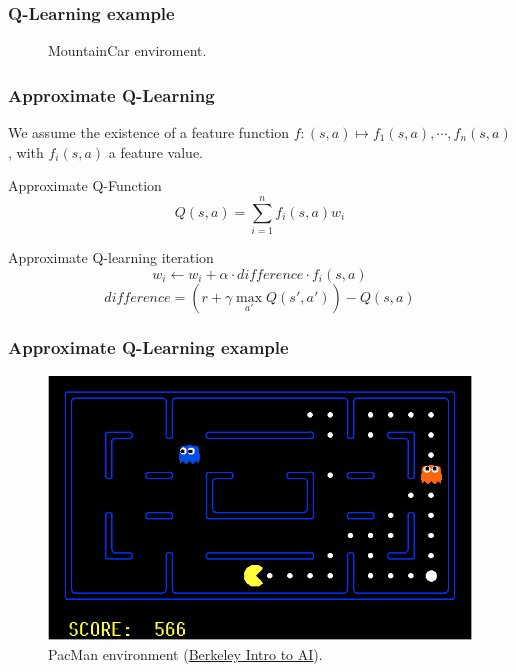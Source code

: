 \documentclass{beamer}
\begin{document}
        \begin{frame}
            \frametitle{Q-Learning example}
            \begin{figure}
                \centering
                \label{fig7:mountain}
                \caption{MountainCar enviroment.}
            \end{figure}
        \end{frame}

        \begin{frame}
            \frametitle{Approximate Q-Learning}
            We assume the existence of a feature function $f: (s, a) \mapsto f_1(s, a), \cdots, f_n(s, a)$, with $f_i(s, a)$ a feature value.
            \begin{block}{Approximate Q-Function}
                $$Q(s, a) = \sum_{i = 1}^n f_i(s, a) w_i$$
            \end{block}
            \begin{block}{Approximate Q-learning iteration}
                $$w_i \leftarrow w_i + \alpha \cdot difference \cdot f_i(s, a)$$
                $$difference = (r + \gamma \max_{a'} Q(s', a')) - Q(s, a)$$
            \end{block}
        \end{frame}

        \begin{frame}
            \frametitle{Approximate Q-Learning example}
            \begin{figure}
                \centering  
                \includegraphics[width=0.8\linewidth]{figures/pacman.png}              
                \caption{PacMan environment (\href{http://ai.berkeley.edu/reinforcement.html}{Berkeley Intro to AI}).}
                \label{fig8:pacman}
            \end{figure}
        \end{frame}
\end{document}
